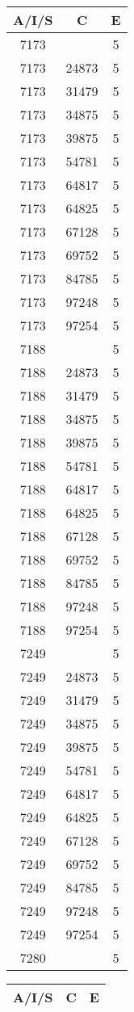 {{\begin{tabular}{|c|c||c|}
        \hline
        \bf A/I/S & \bf C & \bf E \\
        \hline
7173& &5\\ 7173&24873&5\\ 7173&31479&5\\ 7173&34875&5\\ 7173&39875&5\\ 7173&54781&5\\ 7173&64817&5\\ 7173&64825&5\\ 7173&67128&5\\ 7173&69752&5\\ 7173&84785&5\\ 7173&97248&5\\ 7173&97254&5\\ 7188& &5\\ 7188&24873&5\\ 7188&31479&5\\ 7188&34875&5\\ 7188&39875&5\\ 7188&54781&5\\ 7188&64817&5\\ 7188&64825&5\\ 7188&67128&5\\ 7188&69752&5\\ 7188&84785&5\\ 7188&97248&5\\ 7188&97254&5\\ 7249& &5\\ 7249&24873&5\\ 7249&31479&5\\ 7249&34875&5\\ 7249&39875&5\\ 7249&54781&5\\ 7249&64817&5\\ 7249&64825&5\\ 7249&67128&5\\ 7249&69752&5\\ 7249&84785&5\\ 7249&97248&5\\ 7249&97254&5\\ 7280& &5\\ 
        \hline
        \end{tabular}
        \quad
        \begin{tabular}{|c|c||c|}
        \hline
        \bf A/I/S & \bf C & \bf E \\
        \hline

\end{tabular}}}

